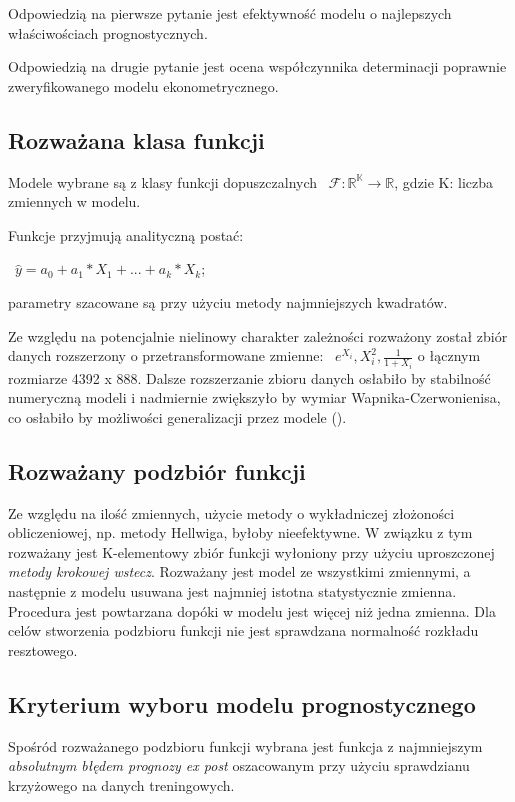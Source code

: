 \documentclass{article}
\begin{document}
Odpowiedzią na pierwsze pytanie jest efektywność modelu o najlepszych właściwościach prognostycznych.

Odpowiedzią na drugie pytanie jest ocena współczynnika determinacji poprawnie zweryfikowanego modelu ekonometrycznego.

\subsection{Rozważana klasa funkcji}
Modele wybrane są z klasy funkcji dopuszczalnych ~$\mathscr{F}: \mathbb{R^K\to R}$,
gdzie K: liczba zmiennych w modelu.

Funkcje przyjmują analityczną postać:

~$\hat{y}=a_0+a_1*X_1+...+a_k*X_k$;

parametry szacowane są przy użyciu metody najmniejszych kwadratów.

Ze względu na potencjalnie nielinowy charakter zależności rozważony został zbiór danych rozszerzony o przetransformowane zmienne: ~$e^{X_i}, X_i^2, \frac{1}{1+X_i}$ o łącznym rozmiarze 4392 x 888. Dalsze rozszerzanie zbioru danych osłabiło by stabilność numeryczną modeli i nadmiernie zwiększyło by wymiar Wapnika-Czerwonienisa, co osłabiło by możliwości generalizacji przez modele (\textcite{Kaminski2017}).

\newpage
\subsection{Rozważany podzbiór funkcji}
Ze względu na ilość zmiennych, użycie metody o wykładniczej złożoności obliczeniowej, np. metody Hellwiga, byłoby nieefektywne. W związku z tym rozważany jest K-elementowy zbiór funkcji wyłoniony przy użyciu uproszczonej \textit{metody krokowej wstecz}. Rozważany jest model ze wszystkimi zmiennymi, a następnie z modelu usuwana jest najmniej istotna statystycznie zmienna. Procedura jest powtarzana dopóki w modelu jest więcej niż jedna zmienna. Dla celów stworzenia podzbioru funkcji nie jest sprawdzana normalność rozkładu resztowego.

\subsection{Kryterium wyboru modelu prognostycznego}
Spośród rozważanego podzbioru funkcji wybrana jest funkcja z najmniejszym \textit{absolutnym błędem prognozy ex post} oszacowanym przy użyciu sprawdzianu krzyżowego na danych treningowych.
\end{document}
